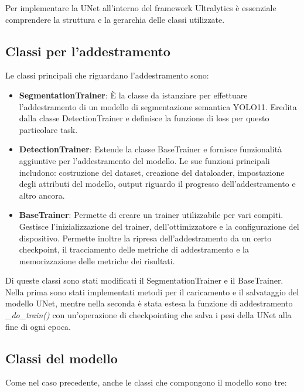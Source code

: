 \documentclass[12pt]{report}
\begin{document}
Per implementare la UNet all'interno del framework Ultralytics è essenziale comprendere la struttura e la gerarchia delle classi utilizzate.

\subsection{Classi per l'addestramento}
\label{sec:classi_per_addestramento}

Le classi principali che riguardano l'addestramento sono:

\begin{itemize}
	\item \textbf{SegmentationTrainer}: È la classe da istanziare per effettuare l'addestramento di un modello di segmentazione semantica YOLO11. Eredita dalla classe DetectionTrainer e definisce la funzione di loss per questo particolare task.
	
	\item \textbf{DetectionTrainer}: Estende la classe BaseTrainer e fornisce funzionalità aggiuntive per l'addestramento del modello. Le sue funzioni principali includono: costruzione del dataset, creazione del dataloader, impostazione degli attributi del modello, output riguardo il progresso dell'addestramento e altro ancora.
	
	\item \textbf{BaseTrainer}: Permette di creare un trainer utilizzabile per vari compiti. Gestisce l'inizializzazione del trainer, dell'ottimizzatore e la configurazione del dispositivo. Permette inoltre la ripresa dell'addestramento da un certo checkpoint, il tracciamento delle metriche di addestramento e la memorizzazione delle metriche dei risultati.
\end{itemize}

Di queste classi sono stati modificati il SegmentationTrainer e il BaseTrainer. Nella prima sono stati implementati metodi per il caricamento e il salvataggio del modello UNet, mentre nella seconda è stata estesa la funzione di addestramento \textit{\_do\_train()} con un'operazione di checkpointing che salva i pesi della UNet alla fine di ogni epoca.

\subsection{Classi del modello}
\label{sec:classi_del_modello}

Come nel caso precedente, anche le classi che compongono il modello sono tre:
\end{document}
